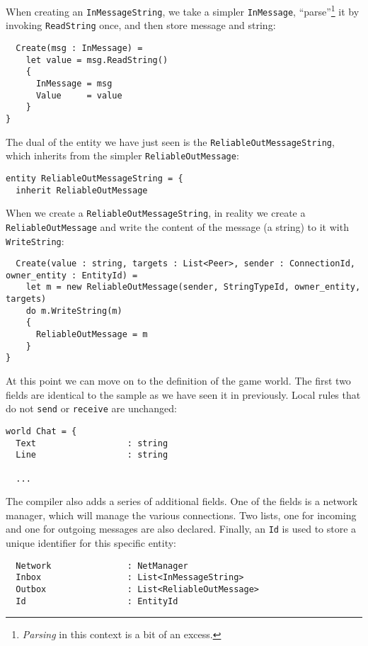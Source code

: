 When creating an \texttt{InMessageString}, we take a simpler \texttt{InMessage}, ``parse''\footnote{\textit{Parsing} in this context is a bit of an excess.} it by invoking \texttt{ReadString} once, and then store message and string:

\begin{lstlisting}
  Create(msg : InMessage) =
    let value = msg.ReadString()
    {
      InMessage = msg
      Value     = value
    }
}
\end{lstlisting}

The dual of the entity we have just seen is the \texttt{ReliableOutMessageString}, which inherits from the simpler \texttt{ReliableOutMessage}:

\begin{lstlisting}
entity ReliableOutMessageString = {
  inherit ReliableOutMessage
\end{lstlisting}

When we create a \texttt{ReliableOutMessageString}, in reality we create a \texttt{ReliableOutMessage} and write the content of the message (a string) to it with \texttt{WriteString}:

\begin{lstlisting}
  Create(value : string, targets : List<Peer>, sender : ConnectionId, owner_entity : EntityId) =
    let m = new ReliableOutMessage(sender, StringTypeId, owner_entity, targets)
    do m.WriteString(m)
    {
      ReliableOutMessage = m
    }
}
\end{lstlisting}

At this point we can move on to the definition of the game world. The first two fields are identical to the sample as we have seen it in previously. Local rules that do not \texttt{send} or \texttt{receive} are unchanged:

\begin{lstlisting}
world Chat = {
  Text                  : string
  Line                  : string
  
  ...
\end{lstlisting}

The compiler also adds a series of additional fields. One of the fields is a network manager, which will manage the various connections. Two lists, one for incoming and one for outgoing messages are also declared. Finally, an \texttt{Id} is used to store a unique identifier for this specific entity:

\begin{lstlisting}
  Network               : NetManager
  Inbox                 : List<InMessageString>
  Outbox                : List<ReliableOutMessage>
  Id                    : EntityId
\end{lstlisting}

